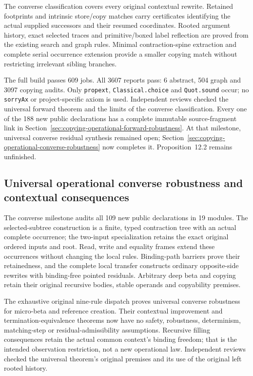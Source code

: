The converse classification covers every original contextual rewrite. Retained
footprints and intrinsic store/copy matches carry certificates identifying the
actual supplied successors and their resumed coordinates. Rooted argument
history, exact selected traces and primitive/boxed label reflection are proved
from the existing search and graph rules. Minimal contraction-spine extraction
and complete serial occurrence extension provide a smaller copying match
without restricting irrelevant sibling branches.

The full build passes 609 jobs. All 3607 reports pass: 6 abstract, 504 graph
and 3097 copying audits. Only \texttt{propext}, \texttt{Classical.choice} and
\texttt{Quot.sound} occur; no \texttt{sorryAx} or project-specific axiom is used.
Independent reviews checked the universal forward theorem and the limits of
the converse classification. Every one of the 188 new public declarations has
a complete immutable source-fragment link in
Section~\ref{sec:copying-operational-forward-robustness}.
At that milestone, universal converse residual synthesis remained open;
Section~\ref{sec:copying-operational-converse-robustness} now completes it.
Proposition~12.2 remains unfinished.


\subsection{Universal operational converse robustness and contextual consequences}
The converse milestone audits all 109 new public declarations in 19 modules.
The selected-subtree construction is a finite, typed contraction tree with
an actual complete occurrence; the two-input specialization retains the
exact original ordered inputs and root. Read, write and equality frames
extend these occurrences without changing the local rules. Binding-path
barriers prove their retainedness, and the complete local transfer constructs
ordinary opposite-side rewrites with binding-free pointed residuals.
Arbitrary deep beta and copying retain their original recursive bodies,
stable operands and copyability premises.

The exhaustive original nine-rule dispatch proves universal converse
robustness for micro-beta and reference creation. Their contextual improvement
and termination-equivalence theorems now have no safety, robustness,
determinism, matching-step or residual-admissibility assumptions. Recursive
filling consequences retain the actual common context's binding freedom;
that is the intended observation restriction, not a new operational law.
Independent reviews checked the universal theorem's original premises and
its use of the original left rooted history.

